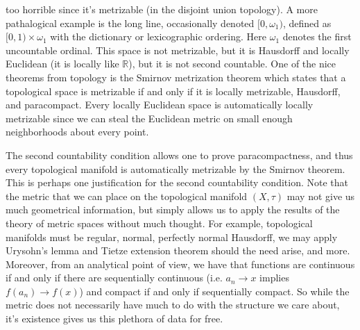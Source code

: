 \documentclass{article}                                                        %
\begin{document}
        too horrible since it's metrizable (in the disjoint union topology). A
        more pathalogical example is the long line, occasionally denoted
        $[0,\omega_{1})$, defined as $[0,1)\times\omega_{1}$ with the dictionary
        or lexicographic ordering. Here $\omega_{1}$ denotes the first
        uncountable ordinal. This space is not metrizable, but it is Hausdorff
        and locally Euclidean (it is locally like $\mathbb{R}$), but it is
        not second countable. One of the nice theorems from topology is the
        Smirnov metrization theorem which states that a topological space is
        metrizable if and only if it is locally metrizable, Hausdorff, and
        paracompact. Every locally Euclidean space is automatically locally
        metrizable since we can steal the Euclidean metric on small enough
        neighborhoods about every point.
        \par\hfill\par
        The second countability condition allows one to prove paracompactness,
        and thus every topological manifold is automatically metrizable by the
        Smirnov theorem. This is perhaps one justification for the second
        countability condition. Note that the metric that we can place on the
        topological manifold $(X,\tau)$ may not give us much geometrical
        information, but simply allows us to apply the results of the theory of
        metric spaces without much thought. For example, topological manifolds
        must be regular, normal, perfectly normal Hausdorff, we may apply
        Urysohn's lemma and Tietze extension theorem should the need arise, and
        more. Moreover, from an analytical point of view, we have that functions
        are continuous if and only if there are sequentially continuous (i.e.
        $a_{n}\rightarrow{x}$ implies $f(a_{n})\rightarrow{f}(x)$) and compact
        if and only if sequentially compact. So while the metric does not
        necessarily have much to do with the structure we care about, it's
        existence gives us this plethora of data for free.
\end{document}
